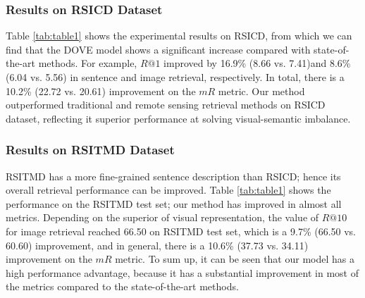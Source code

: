 \documentclass[journal]{IEEEtran}
\begin{document}
\subsubsection{Results on RSICD Dataset}
Table \ref{tab:table1} shows the experimental results on RSICD, from which we can find that the DOVE model shows a significant increase compared with state-of-the-art methods. For example, $R@1$ improved by 16.9\% (8.66 vs. 7.41)and 8.6\% (6.04 vs. 5.56) in sentence and image retrieval, respectively. In total, there is a 10.2\% (22.72 vs. 20.61) improvement on the $mR$ metric. Our method outperformed traditional and remote sensing retrieval methods on RSICD dataset, reflecting it superior performance at solving visual-semantic imbalance.
\subsubsection{Results on RSITMD Dataset}
RSITMD has a more fine-grained sentence description than RSICD; hence its overall retrieval performance can be improved. Table \ref{tab:table1} shows the performance on the RSITMD test set; our method has improved in almost all metrics. Depending on the superior of visual representation, the value of $R@10$ for image retrieval reached 66.50 on RSITMD test set, which is a 9.7\% (66.50 vs. 60.60) improvement, and in general, there is a 10.6\% (37.73 vs. 34.11) improvement on the $mR$ metric. To sum up, it can be seen that our model has a high performance advantage, because it has a substantial improvement in most of the metrics compared to the state-of-the-art methods.
\end{document}
